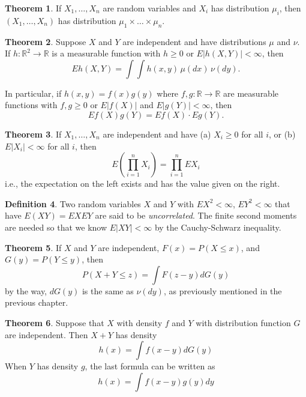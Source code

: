 \documentclass{article}
\theoremstyle{definition}
\newtheorem{theorem}{Theorem}[section]
\newtheorem{definition}[theorem]{Definition}
\begin{document}
\begin{theorem}
    If $X_1, \dots, X_n$ are random variables and $X_i$ has distribution $\mu_i$, then $(X_1, \dots, X_n)$ has distribution $\mu_1 \times \dots \times \mu_n$.
\end{theorem}

\begin{theorem}
    Suppose \( X \) and \( Y \) are independent and have distributions \( \mu \) and \( \nu \). If \( h : \mathbb{R}^2 \to \mathbb{R} \) is a measurable function with \( h \geq 0 \) or \( E|h(X, Y)| < \infty \), then
    \[
        E h(X, Y) = \int \int h(x, y) \, \mu(dx) \, \nu(dy).
    \]

    In particular, if \( h(x, y) = f(x) g(y) \) where \( f, g : \mathbb{R} \to \mathbb{R} \) are measurable functions with \( f, g \geq 0 \) or \( E|f(X)| \) and \( E|g(Y)| < \infty \), then
    \[
        E f(X) g(Y) = E f(X) \cdot E g(Y).
    \]
\end{theorem}

\begin{theorem}
    If \( X_1, \dots, X_n \) are independent and have (a) \( X_i \geq 0 \) for all \( i \), or (b) \( E|X_i| < \infty \) for all \( i \), then
    \[
        E \left( \prod_{i=1}^n X_i \right) = \prod_{i=1}^n E X_i
    \]
    i.e., the expectation on the left exists and has the value given on the right.
\end{theorem}

\begin{definition}
    Two random variables $X$ and $Y$ with $EX^2 < \infty$, $EY^2 < \infty$ that have $E(XY)=EXEY$ are said to be \emph{uncorrelated}. The finite second moments are needed so that we know $E|XY| < \infty$ by the Cauchy-Schwarz inequality.
\end{definition}

\begin{theorem}
    If $X$ and $Y$ are independent, $F(x) = P(X \leq x)$, and $G(y) = P(Y \leq y)$, then
    $$ P(X+Y \leq z) = \int F(z - y) dG(y)$$
    by the way, $dG(y)$ is the same as $\nu (dy)$, as previously mentioned in the previous chapter.
\end{theorem}

\begin{theorem}
    Suppose that $X$ with density $f$ and $Y$ with distribution function $G$ are independent. Then $X+Y$ has density
    $$ h(x) = \int f(x - y) dG(y)$$
    When $Y$ has density $g$, the last formula can be written as
    $$ h(x) = \int f(x-y) g(y) dy$$
\end{theorem}
\end{document}
